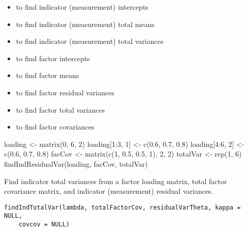 \documentclass[a4paper]{book}
\begin{document}
\begin{SeeAlso}\relax
\begin{itemize}

\item {} to find indicator (measurement) intercepts
\item {} to find indicator (measurement) total means
\item {} to find indicator (measurement) total variances
\item {} to find factor intercepts
\item {} to find factor means
\item {} to find factor residual variances
\item {} to find factor total variances
\item {} to find factor covariances

\end{itemize}

\end{SeeAlso}
%
\begin{Examples}
\begin{ExampleCode}
loading <- matrix(0, 6, 2)
loading[1:3, 1] <- c(0.6, 0.7, 0.8)
loading[4:6, 2] <- c(0.6, 0.7, 0.8)
facCov <- matrix(c(1, 0.5, 0.5, 1), 2, 2)
totalVar <- rep(1, 6)
findIndResidualVar(loading, facCov, totalVar)
\end{ExampleCode}
\end{Examples}
%
\begin{Description}\relax
Find indicator total variances from a factor loading matrix, total factor covariance matrix, and indicator (measurement) residual variances.
\end{Description}
%
\begin{Usage}
\begin{verbatim}
findIndTotalVar(lambda, totalFactorCov, residualVarTheta, kappa = NULL, 
	covcov = NULL)
\end{verbatim}
\end{Usage}
%
\end{document}

